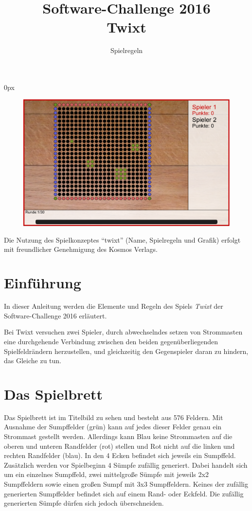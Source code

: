 \documentclass[a4paper, ngerman]{scrartcl}
\title{Software-Challenge 2016 \\ Twixt}
\subtitle{Spielregeln}
\begin{document}
\parindent0px
\maketitle

\begin{figure}[h!]
        \centering
        \includegraphics[width=\linewidth]{bilder/gui.png}
\end{figure}
\vspace*{\fill}

Die Nutzung des Spielkonzeptes "`twixt"' (Name, Spielregeln und Grafik)
erfolgt mit freundlicher Genehmigung des Kosmos Verlags.

\newpage

\tableofcontents

\newpage

\section{Einführung}

In dieser Anleitung werden die Elemente und Regeln des Spiels \emph{Twixt} der
Software-Challenge 2016 erläutert.

Bei Twixt versuchen zwei Spieler, durch abwechselndes setzen von Strommasten
eine durchgehende Verbindung zwischen den beiden gegenüberliegenden Spielfeldrändern
herzustellen, und gleichzeitig den Gegenspieler daran zu hindern, das Gleiche zu
tun. 

\section{Das Spielbrett}
Das Spielbrett ist im Titelbild zu sehen und besteht aus 576 Feldern.
Mit Ausnahme der Sumpffelder (grün) kann auf jedes dieser Felder genau 
ein Strommast gestellt werden. Allerdings kann Blau keine Strommasten auf 
die oberen und unteren Randfelder (rot) stellen und Rot nicht auf die linken 
und rechten Randfelder (blau). In den 4 Ecken befindet sich jeweils ein
Sumpffeld.
Zusätzlich werden vor Spielbeginn 4 Sümpfe zufällig generiert. Dabei handelt sich um 
ein einzelnes Sumpffeld, zwei mittelgroße Sümpfe mit jeweils 2x2 Sumpffeldern 
sowie einen großen Sumpf mit 3x3 Sumpffeldern. Keines der zufällig generierten Sumpffelder 
befindet sich auf einem Rand- oder Eckfeld. Die zufällig generierten Sümpfe dürfen 
sich jedoch überschneiden.
\end{document}
